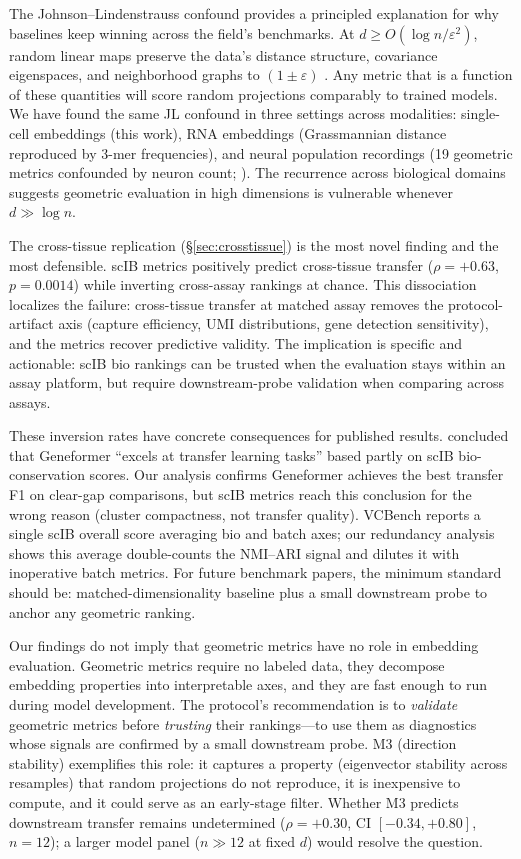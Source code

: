 \documentclass[10pt,letterpaper]{article}
\begin{document}
The Johnson--Lindenstrauss confound provides a principled explanation for why baselines keep winning across the field's benchmarks. At $d \geq O(\log n / \varepsilon^2)$, random linear maps preserve the data's distance structure, covariance eigenspaces, and neighborhood graphs to $(1 \pm \varepsilon)$ \citep{johnsonlindenstrauss1984}. Any metric that is a function of these quantities will score random projections comparably to trained models. We have found the same JL confound in three settings across modalities: single-cell embeddings (this work), RNA embeddings (Grassmannian distance reproduced by 3-mer frequencies), and neural population recordings (19 geometric metrics confounded by neuron count; \citealp{tower2026bracket}). The recurrence across biological domains suggests geometric evaluation in high dimensions is vulnerable whenever $d \gg \log n$.

The cross-tissue replication (\S\ref{sec:crosstissue}) is the most novel finding and the most defensible. scIB metrics positively predict cross-tissue transfer ($\rho = +0.63$, $p = 0.0014$) while inverting cross-assay rankings at chance. This dissociation localizes the failure: cross-tissue transfer at matched assay removes the protocol-artifact axis (capture efficiency, UMI distributions, gene detection sensitivity), and the metrics recover predictive validity. The implication is specific and actionable: scIB bio rankings can be trusted when the evaluation stays within an assay platform, but require downstream-probe validation when comparing across assays.

These inversion rates have concrete consequences for published results. \citet{wu2025scfm} concluded that Geneformer ``excels at transfer learning tasks'' based partly on scIB bio-conservation scores. Our analysis confirms Geneformer achieves the best transfer F1 on clear-gap comparisons, but scIB metrics reach this conclusion for the wrong reason (cluster compactness, not transfer quality). VCBench \citep{vcbench2026} reports a single scIB overall score averaging bio and batch axes; our redundancy analysis shows this average double-counts the NMI--ARI signal and dilutes it with inoperative batch metrics. For future benchmark papers, the minimum standard should be: matched-dimensionality baseline plus a small downstream probe to anchor any geometric ranking.

Our findings do not imply that geometric metrics have no role in embedding evaluation. Geometric metrics require no labeled data, they decompose embedding properties into interpretable axes, and they are fast enough to run during model development. The protocol's recommendation is to \emph{validate} geometric metrics before \emph{trusting} their rankings---to use them as diagnostics whose signals are confirmed by a small downstream probe. M3 (direction stability) exemplifies this role: it captures a property (eigenvector stability across resamples) that random projections do not reproduce, it is inexpensive to compute, and it could serve as an early-stage filter. Whether M3 predicts downstream transfer remains undetermined ($\rho = +0.30$, CI $[-0.34, +0.80]$, $n = 12$); a larger model panel ($n \gg 12$ at fixed $d$) would resolve the question.
\end{document}
